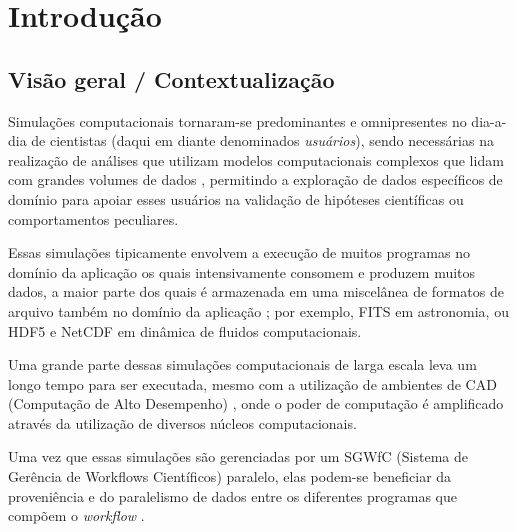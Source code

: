 
\chapter{Introdução}


\section{Visão geral / Contextualização}

Simulações computacionais tornaram-se predominantes e omnipresentes no dia-a-dia de cientistas (daqui em diante denominados \textit{usuários}), sendo necessárias na realização de análises que utilizam modelos computacionais complexos que lidam com grandes volumes de dados \cite{silva2015analyzing}, permitindo a exploração de dados específicos de domínio para apoiar esses usuários na validação de hipóteses científicas ou comportamentos peculiares.

Essas simulações tipicamente envolvem a execução de muitos programas no domínio da aplicação os quais intensivamente consomem e produzem muitos dados, a maior parte dos quais é armazenada em uma miscelânea de formatos de arquivo também no domínio da aplicação \cite{silva2015analyzing}; por exemplo,  FITS \cite{greisen2002representations} em astronomia, ou  HDF5 \cite{hdfgroup2014hdf5} e  NetCDF \cite{rew1990netcdf} em dinâmica de fluidos computacionais.

Uma grande parte dessas simulações computacionais de larga escala leva um longo tempo para ser executada, mesmo com a utilização de ambientes de  CAD (Computação de Alto Desempenho) \cite{silva2017raw}, onde o poder de computação é amplificado através da utilização de diversos núcleos computacionais. 

Uma vez que essas simulações são gerenciadas por um  SGWfC (Sistema de Gerência de Workflows Científicos) paralelo, elas podem-se beneficiar da proveniência e do paralelismo de dados entre os diferentes programas que compõem o \textit{workflow} \cite{bux2013parallelization}.


